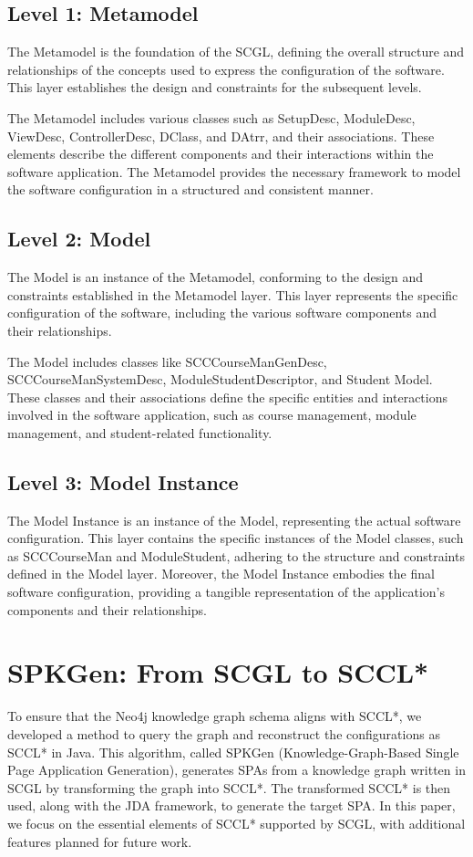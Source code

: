 \documentclass[runningheads]{llncs}
\begin{document}
\subsection{Level 1: Metamodel}
The Metamodel is the foundation of the SCGL, defining the overall structure and relationships of the concepts used to express the configuration of the software. This layer establishes the design and constraints for the subsequent levels.

The Metamodel includes various classes such as SetupDesc, ModuleDesc, ViewDesc, ControllerDesc, DClass, and DAtrr, and their associations. These elements describe the different components and their interactions within the software application. The Metamodel provides the necessary framework to model the software configuration in a structured and consistent manner.

\subsection{Level 2: Model}
The Model is an instance of the Metamodel, conforming to the design and constraints established in the Metamodel layer. This layer represents the specific configuration of the software, including the various software components and their relationships.

The Model includes classes like SCCCourseManGenDesc, SCCCourseManSystemDesc, ModuleStudentDescriptor, and Student Model. These classes and their associations define the specific entities and interactions involved in the software application, such as course management, module management, and student-related functionality.

\subsection{Level 3: Model Instance}
The Model Instance is an instance of the Model, representing the actual software configuration. This layer contains the specific instances of the Model classes, such as SCCCourseMan and ModuleStudent, adhering to the structure and constraints defined in the Model layer. Moreover, the Model Instance embodies the final software configuration, providing a tangible representation of the application's components and their relationships.

\section{SPKGen: From SCGL to SCCL*} \label{section4}
\vspace{-0.2cm}
To ensure that the Neo4j knowledge graph schema aligns with SCCL*, we developed a method to query the graph and reconstruct the configurations as SCCL* in Java. This algorithm, called SPKGen (Knowledge-Graph-Based Single Page Application Generation), generates SPAs from a knowledge graph written in SCGL by transforming the graph into SCCL*. The transformed SCCL* is then used, along with the JDA framework, to generate the target SPA. In this paper, we focus on the essential elements of SCCL* supported by SCGL, with additional features planned for future work.
\end{document}
